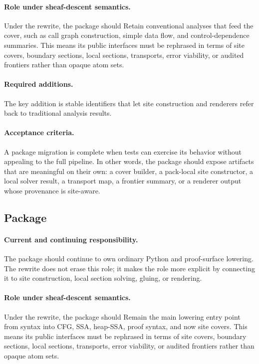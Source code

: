 \documentclass[11pt]{report}
\DeclareRobustCommand{\py}[1]{\texttt{\detokenize{#1}}}
\theoremstyle{definition}
\theoremstyle{plain}
\begin{document}
\paragraph{Role under sheaf-descent semantics.}
Under the rewrite, the package should Retain conventional analyses that feed the cover, such as call graph construction, simple data flow, and control-dependence summaries. This means its public
interfaces must be rephrased in terms of site covers, boundary sections,
local sections, transports, error viability, or audited frontiers rather
than opaque atom sets.

\paragraph{Required additions.}
The key addition is stable identifiers that let site construction and renderers refer back to traditional analysis results.

\paragraph{Acceptance criteria.}
A package migration is complete when tests can exercise its behavior without
appealing to the full pipeline. In other words, the package should expose
artifacts that are meaningful on their own: a cover builder, a pack-local
site constructor, a local solver result, a transport map, a frontier summary,
or a renderer output whose provenance is site-aware.

\subsection{Package \py{src/deppy/surface}}

\paragraph{Current and continuing responsibility.}
The package \py{src/deppy/surface} should continue to own ordinary Python and proof-surface lowering. The
rewrite does not erase this role; it makes the role more explicit by
connecting it to site construction, local section solving, gluing, or
rendering.

\paragraph{Role under sheaf-descent semantics.}
Under the rewrite, the package should Remain the main lowering entry point from syntax into CFG, SSA, heap-SSA, proof syntax, and now site covers. This means its public
interfaces must be rephrased in terms of site covers, boundary sections,
local sections, transports, error viability, or audited frontiers rather
than opaque atom sets.
\end{document}
